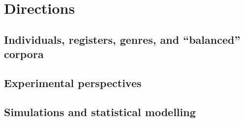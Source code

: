 \chapter{Directions}
\label{sec:directions}

\section{Individuals, registers, genres, and ``balanced'' corpora}
\label{sec:individualsregistersgenresandbalancedcorpora}


\section{Experimental perspectives}
\label{sec:experimentalperspectives}


\section{Simulations and statistical modelling}
\label{sec:simulationsandstatisticalmodelling}
